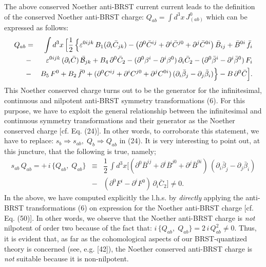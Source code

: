\documentclass[12pt]{article}
\begin{document}
The above conserved Noether anti-BRST current current leads to the definition of the conserved Noether anti-BRST charge:
$Q_{ab} = \int d^3 x\, J^0_{(ab)}$ which can be expressed as follows:
 \begin{eqnarray}\label{50}
Q_{ab}  &=&   \int d^3 x\, \Big [\dfrac{1}{2}\, \Big \{\varepsilon^{0ijk}\, B_1 (\partial_i \bar C_{jk}) 
-  \big (\partial^0 \bar C^{ij} + \partial^i \bar C^{j0} + \partial^j \bar C^{0i} \big )\, \bar B_{ij} 
 + \bar B^{0i}\,\bar f_i  
\nonumber\\
&-& \varepsilon^{0ijk}\, (\partial_i \bar C)\, \bar {\cal B}_{jk} + B_4 \, \partial^0 \bar C_2 - (\partial^0  \beta^i
- \partial^i \beta^0)\, \partial_i \bar C_2 - (\partial^0 \bar \beta^i - \partial^i \bar \beta^0)\,  F_i  \nonumber\\
&-& B_5\,  F^0 + B_2 \, \bar f^0 +(\partial^0  C^{ij} + \partial^i  C^{j0} + \partial^j C^{0i})\,(\partial_i \bar \beta_j
- \partial_j \bar \beta_i) \Big \} - B \, \partial^0 \bar C \Big ].
\end{eqnarray}
This Noether conserved charge turns out to be the generator for the infinitesimal, continuous and nilpotent anti-BRST symmetry transformations
(6). For this purpose, we have to exploit the general relationship between the infinitesimal and continuous symmetry transformations and
their generator as the Noether conserved charge [cf. Eq. (24)]. In other words, to corroborate this statement, we have to replace:
$s_b \Rightarrow s_{ab}, \; Q_b \Rightarrow Q_{ab}$ in (24). It is very interesting to point out, at this juncture, that the following is true, namely; 
\begin{eqnarray}\label{51}
s_{ab} \, Q_{ab} = +\, i\, \big \{Q_{ab}, \; Q_{ab} \big \} &\equiv& \dfrac{1}{2}\,
\int d^3 x \Big [(\partial^0  \bar B^{ij} + \partial^i  \bar B^{j0} + \partial^j \bar B^{0i})\,(\partial_i \bar \beta_j - \partial_j \bar \beta_i) \nonumber\\
&-& (\partial^0  F^i - \partial^i F^0)\, \partial_i \bar C_2   \Big ] \neq 0.
\end{eqnarray}
In the above, we have computed explicitly the l.h.s. by {\it directly} applying the anti-BRST transformations (6) on expression for the Noether
anti-BRST charge [cf. Eq. (50)]. In other words, we observe that the Noether anti-BRST charge is {\it not} nilpotent of order two because of 
the fact that: $i\, \big \{Q_{ab}, \; Q_{ab} \big \} = 2\, i\, Q_{ab}^2 \neq 0 $. Thus, it is evident that, as far as the cohomological aspects
of our BRST-quantized theory is concerned (see, e.g. [42]), the Noether conserved anti-BRST charge is {\it not} suitable because it is non-nilpotent. 
\end{document}
